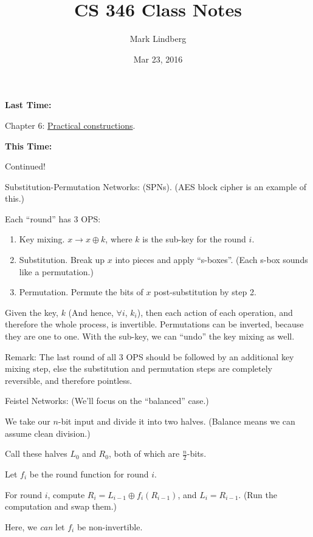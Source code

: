 \documentclass[12pt]{article}
\newcommand{\xor}{\oplus}
\begin{document}
\title{CS 346 Class Notes}
\date{Mar 23, 2016}
\author{Mark Lindberg}
\maketitle
\thispagestyle{fancy}

{\bf Last Time:}

Chapter 6: \underline{Practical constructions}.

{\bf This Time:}

Continued!

Substitution-Permutation Networks: (SPNs). (AES block cipher is an example of this.)

Each ``round'' has 3 OPS:\begin{enumerate}

\item Key mixing. $x\to x\xor k$, where $k$ is the sub-key for the round $i$.

\item Substitution. Break up $x$ into pieces and apply ``s-boxes''. (Each s-box sounds like a permutation.)

\item Permutation. Permute the bits of $x$ post-substitution by step 2.

\end{enumerate}

Given the key, $k$ (And hence, $\forall i$, $k_i$), then each action of each operation, and therefore the whole process, is invertible. Permutations can be inverted, because they are one to one. With the sub-key, we can ``undo'' the key mixing as well.

Remark: The last round of all 3 OPS should be followed by an additional key mixing step, else the substitution and permutation steps are completely reversible, and therefore pointless.

Feistel Networks: (We'll focus on the ``balanced'' case.)

We take our $n$-bit input and divide it into two halves. (Balance means we can assume clean division.)

Call these halves $L_0$ and $R_0$, both of which are $\frac{n}{2}$-bits.

Let $f_i$ be the round function for round $i$.

For round $i$, compute $R_i=L_{i-1}\xor f_i(R_{i-1})$, and $L_i=R_{i-1}$. (Run the computation and swap them.)

Here, we {\it can} let $f_i$ be non-invertible.
\end{document}
